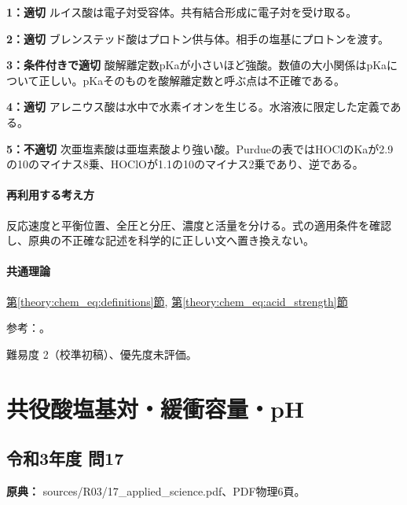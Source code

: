 \noindent\textbf{1：適切} ルイス酸は電子対受容体。共有結合形成に電子対を受け取る。\par

\noindent\textbf{2：適切} ブレンステッド酸はプロトン供与体。相手の塩基にプロトンを渡す。\par

\noindent\textbf{3：条件付きで適切} 酸解離定数pKaが小さいほど強酸。数値の大小関係はpKaについて正しい。pKaそのものを酸解離定数と呼ぶ点は不正確である。\par

\noindent\textbf{4：適切} アレニウス酸は水中で水素イオンを生じる。水溶液に限定した定義である。\par

\noindent\textbf{5：不適切} 次亜塩素酸は亜塩素酸より強い酸。Purdueの表ではHOClのKaが2.9の10のマイナス8乗、HOClOが1.1の10のマイナス2乗であり、逆である。\par

\paragraph{再利用する考え方} 反応速度と平衡位置、全圧と分圧、濃度と活量を分ける。式の適用条件を確認し、原典の不正確な記述を科学的に正しい文へ置き換えない。

\paragraph{共通理論} \hyperref[theory:chem_eq:definitions]{第\ref*{theory:chem_eq:definitions}節}, \hyperref[theory:chem_eq:acid_strength]{第\ref*{theory:chem_eq:acid_strength}節}

\par 参考：\cite{iupac_greenbook2012,purdue_acid_strength}。

\par 難易度 2（校準初稿）、優先度未評価。

\section{共役酸塩基対・緩衝容量・pH}

\subsection{令和3年度 問17}
\label{q:r03-reg-applied-17}

\noindent\textbf{原典：} sources/R03/17\_applied\_science.pdf、PDF物理6頁。

